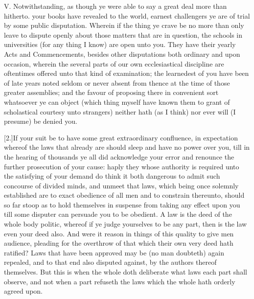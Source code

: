 V. Notwithstanding, as though ye were able to say a great deal more than hitherto. your books have revealed to the world, earnest challengers ye are of trial by some public disputation. Wherein if the thing ye crave be no more than only leave to dispute openly about those matters that are in question, the schools in universities (for any thing I know) are open unto you. They have their yearly Acts and Commencements, besides other disputations both ordinary and upon occasion, wherein the several parts of our own ecclesiastical discipline are oftentimes offered unto that kind of examination; the learnedest of you have been of late years noted seldom or never absent from thence at the time of those greater assemblies; and the favour of proposing there in convenient sort whatsoever ye can object (which thing myself have known them to grant of scholastical courtesy unto strangers) neither hath (as I think) nor ever will (I presume) be denied you.

[2.]If your suit be to have some great extraordinary confluence, in expectation whereof the laws that already are should sleep and have no power over you, till in the hearing of thousands ye all did acknowledge your error and renounce the further prosecution of your cause: haply they whose authority is required unto the satisfying of your demand do think it both dangerous to admit such concourse of divided minds, and unmeet that laws, which being once solemnly established are to exact obedience of all men and to constrain thereunto, should so far stoop as to hold themselves in suspense from taking any effect upon you till some disputer can persuade you to be obedient. A law is the deed of the whole body politic, whereof if ye judge yourselves to be any part, then is the law even your deed also. And were it reason in things of this quality to give men audience, pleading for the overthrow of that which their own very deed hath ratified? Laws that have been approved may be (no man doubteth) again repealed, and to that end also disputed against, by the authors thereof themselves. But this is when the whole doth deliberate what laws each part shall observe, and not when a part refuseth the laws which the whole hath orderly agreed upon.

